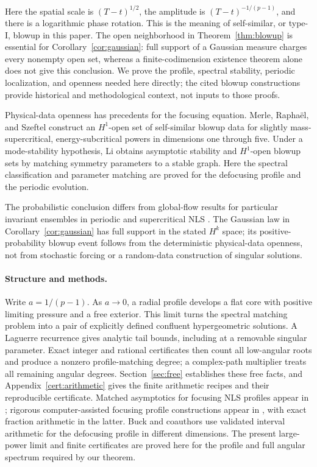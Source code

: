\documentclass[11pt]{article}
\numberwithin{equation}{section}
\theoremstyle{definition}
\theoremstyle{remark}
\begin{document}
Here the spatial scale is $(T-t)^{1/2}$, the amplitude is
$(T-t)^{-1/(p-1)}$, and there is a logarithmic phase rotation. This is
the meaning of self-similar, or type-I, blowup in this paper.
The open neighborhood in Theorem~\ref{thm:blowup} is essential for
Corollary~\ref{cor:gaussian}: full support of a Gaussian measure charges
every nonempty open set, whereas a finite-codimension existence theorem
alone does not give this conclusion. We prove the profile, spectral
stability, periodic localization, and openness needed here directly;
the cited blowup constructions provide historical and methodological
context, not inputs to those proofs.

Physical-data openness has precedents for the focusing equation.
Merle, Rapha\"el, and Szeftel \cite[Theorem~1.2]{MRS2010} construct
an $H^1$-open set of self-similar blowup data for slightly
mass-supercritical, energy-subcritical powers in dimensions one through
five. Under a mode-stability hypothesis, Li
\cite[Theorems~1.4--1.5]{Li2023} obtains asymptotic stability and
$H^1$-open blowup sets by matching symmetry parameters to a stable
graph. Here the spectral classification and parameter matching are
proved for the defocusing profile and the periodic evolution.

The probabilistic conclusion differs from global-flow results for
particular invariant ensembles in periodic and supercritical NLS
\cite{Bourgain1994,Sy2021,GueyeEtAl2025}. The Gaussian law in
Corollary~\ref{cor:gaussian} has full support in the stated $H^k$ space;
its positive-probability blowup event follows from the deterministic
physical-data openness, not from stochastic forcing or a random-data
construction of singular solutions.

\paragraph{Structure and methods.}
Write $a=1/(p-1)$. As $a\to0$, a radial profile develops a flat core
with positive limiting pressure and a free exterior. This limit turns
the spectral matching problem into a pair of explicitly defined
confluent hypergeometric solutions. A Laguerre recurrence gives analytic
tail bounds, including at a removable singular parameter. Exact integer
and rational certificates then count all low-angular roots and produce
a nonzero profile-matching degree; a complex-path multiplier treats
all remaining angular degrees. Section~\ref{sec:free} establishes these
free facts, and Appendix~\ref{cert:arithmetic} gives the finite
arithmetic recipes and their reproducible certificate.
Matched asymptotics for focusing NLS profiles appear in
\cite{BMR2021}; rigorous computer-assisted focusing profile
constructions appear in \cite{DahneFigueras2026,
DonningerSchorkhuber2026}, with exact fraction arithmetic in the latter.
Buck and coauthors \cite{BuckEtAl2026} use validated interval
arithmetic for the defocusing profile in different dimensions.
The present large-power limit and finite certificates are proved here
for the profile and full angular spectrum required by our theorem.
\end{document}
